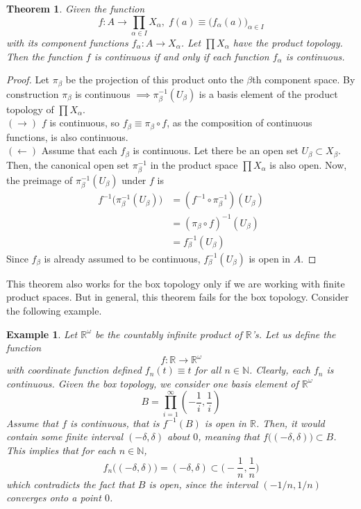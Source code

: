 \documentclass{article}
\newtheorem{theorem}{Theorem}[section]
\newtheorem{example}{Example}[section]
\theoremstyle{remark}
\theoremstyle{definition}
\begin{document}
\begin{theorem}
Given the function 
\[f: A \longrightarrow \prod_{\alpha \in I} X_\alpha, \; f(a) \equiv \big( f_\alpha (a) \big)_{\alpha \in I}\]
with its component functions $f_\alpha: A \longrightarrow X_\alpha$. Let $\prod X_\alpha$ have the product topology. Then the function $f$ is continuous if and only if each function $f_\alpha$ is continuous. 
\end{theorem}
\begin{proof}
Let $\pi_\beta$ be the projection of this product onto the $\beta$th component space. By construction $\pi_\beta$ is continuous $\implies \pi_\beta^{-1} (U_\beta)$ is a basis element of the product topology of $\prod X_\alpha$. \\
$(\rightarrow)$ $f$ is continuous, so $f_\beta \equiv \pi_\beta \circ f$, as the composition of continuous functions, is also continuous. \\
$(\leftarrow)$ Assume that each $f_\beta$ is continuous. Let there be an open set $U_\beta \subset X_\beta$. Then, the canonical open set $\pi_\beta^{-1}$ in the product space $\prod X_\alpha$ is also open. Now, the preimage of $\pi_\beta^{-1} (U_\beta)$ under $f$ is \begin{align*}
    f^{-1} \big( \pi_\beta^{-1} (U_\beta)\big) & = (f^{-1} \circ \pi_\beta^{-1})(U_\beta) \\
    & = (\pi_\beta \circ f)^{-1} (U_\beta) \\
    & = f_\beta^{-1} (U_\beta)
\end{align*}
Since $f_\beta$ is already assumed to be continuous, $f_\beta^{-1} (U_\beta)$ is open in $A$. 
\end{proof}

This theorem also works for the box topology only if we are working with finite product spaces. But in general, this theorem fails for the box topology. Consider the following example. 

\begin{example}
Let $\mathbb{R}^\omega$ be the countably infinite product of $\mathbb{R}$'s. Let us define the function 
\[f: \mathbb{R} \longrightarrow \mathbb{R}^\omega\]
with coordinate function defined $f_n (t) \equiv t$ for all $n \in \mathbb{N}$. Clearly, each $f_n$ is continuous. Given the box topology, we consider one basis element of $\mathbb{R}^\omega$
\[B = \prod_{i=1}^\infty (-\frac{1}{i}, \frac{1}{i})\]
Assume that $f$ is continuous, that is $f^{-1}(B)$ is open in $\mathbb{R}$. Then, it would contain some finite interval $(-\delta, \delta)$ about $0$, meaning that $f\big( (-\delta, \delta)\big) \subset B$. This implies that for each $n \in \mathbb{N}$, 
\[f_n \big( (-\delta, \delta) \big) = (-\delta, \delta) \subset \Big( -\frac{1}{n}, \frac{1}{n} \Big)\]
which contradicts the fact that $B$ is open, since the interval $(-1/n, 1/n)$ converges onto a point $0$. 
\end{example}
\end{document}
